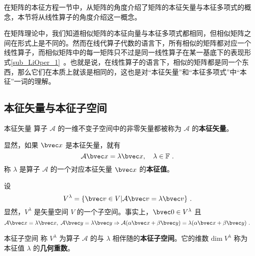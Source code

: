 在矩阵的本征方程一节中，从矩阵的角度介绍了矩阵的本征矢量与本征多项式的概念，本节将从线性算子的角度介绍这一概念。

在矩阵理论中，我们知道相似矩阵的本征向量与本征多项式都相同，但相似矩阵之间在形式上是不同的。然而在线代算子代数的语言下，所有相似的矩阵都对应一个线性算子，而相似矩阵中的每一矩阵只不过是同一线性算子在某一基底下的表现形式\autoref{sub_LiOper_1}~。也就是说，在线性算子的语言下，相似的矩阵都是同一个东西，那么它们在本质上就该是相同的，这也是对“本征矢量”和“本征多项式”中“本征”一词的理解。

\subsection{本征矢量与本征子空间}
\begin{definition}{本征矢量}
算子 $\mathcal{A}$ 的一维不变子空间中的非零矢量都被称为 $\mathcal{A}$ 的\textbf{本征矢量}。
\end{definition}
显然，如果 $\bvec x$ 是本征矢量，就有
\begin{equation}\label{eq_EigVM_1}
\mathcal{A}\bvec x=\lambda \bvec x,\quad \lambda\in\mathbb{F}~.
\end{equation}
称 $\lambda$ 是算子 $\mathcal{A}$ 的一个对应本征矢量 $\bvec x$ 的\textbf{本征值}。

设
\begin{equation}
V^{\lambda}=\{\bvec v\in V|\mathcal{A}\bvec v=\lambda \bvec v\}~.
\end{equation}
显然，$V^{\lambda}$ 是矢量空间 $V$ 的一个子空间。事实上，$\bvec 0\in V^{\lambda}$ 且
\begin{equation}
\mathcal{A}\bvec x=\lambda \bvec x,\;\mathcal{A}\bvec y=\lambda \bvec y\Rightarrow\mathcal{A}(\alpha\bvec x+\beta\bvec y)=\lambda(\alpha\bvec x+\beta \bvec y)~.
\end{equation}
\begin{definition}{本征子空间}\label{def_EigVM_1}
称 $V^{\lambda}$ 为算子 $\mathcal{A}$ 的与 $\lambda$ 相伴随的\textbf{本征子空间}。它的维数 $\mathrm{dim}\;V^{\lambda}$ 称为本征值 $\lambda$ 的\textbf{几何重数}。 
\end{definition}

